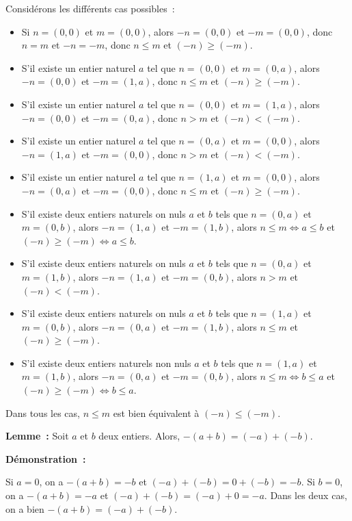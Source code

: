     Considérons les différents cas possibles : 
    \begin{itemize}[nosep]
        \item Si $n = (0,0)$ et $m = (0,0)$, alors $-n = (0,0)$ et $-m = (0,0)$, donc $n=m$ et $-n = -m$, donc $n \leq m$ et $(-n) \geq (-m)$.
        \item S'il existe un entier naturel $a$ tel que $n = (0,0)$ et $m = (0,a)$, alors $-n = (0,0)$ et $-m = (1,a)$, donc $n \leq m$ et $(-n) \geq (-m)$.
        \item S'il existe un entier naturel $a$ tel que $n = (0,0)$ et $m = (1,a)$, alors $-n = (0,0)$ et $-m = (0,a)$, donc $n > m$ et $(-n) < (-m)$.
        \item S'il existe un entier naturel $a$ tel que $n = (0,a)$ et $m = (0,0)$, alors $-n = (1,a)$ et $-m = (0,0)$, donc $n > m$ et $(-n) < (-m)$.
        \item S'il existe un entier naturel $a$ tel que $n = (1,a)$ et $m = (0,0)$, alors $-n = (0,a)$ et $-m = (0,0)$, donc $n \leq m$ et $(-n) \geq (-m)$.
        \item S'il existe deux entiers naturels on nuls $a$ et $b$ tels que $n = (0,a)$ et $m = (0,b)$, alors $-n = (1,a)$ et $-m = (1,b)$, alors $n \leq m \Leftrightarrow a \leq b$ et $(-n) \geq (-m) \Leftrightarrow a \leq b$.
        \item S'il existe deux entiers naturels on nuls $a$ et $b$ tels que $n = (0,a)$ et $m = (1,b)$, alors $-n = (1,a)$ et $-m = (0,b)$, alors $n > m$ et $(-n) < (-m)$.
        \item S'il existe deux entiers naturels on nuls $a$ et $b$ tels que $n = (1,a)$ et $m = (0,b)$, alors $-n = (0,a)$ et $-m = (1,b)$, alors $n \leq m$ et $(-n) \geq (-m)$.
        \item S'il existe deux entiers naturels non nuls $a$ et $b$ tels que $n = (1,a)$ et $m = (1,b)$, alors $-n = (0,a)$ et $-m = (0,b)$, alors $n \leq m \Leftrightarrow b \leq a$ et $(-n) \geq (-m) \Leftrightarrow b \leq a$.
    \end{itemize}
    Dans tous les cas, $n \leq m$ est bien équivalent à $(-n) \leq (-m)$.

    \done

\medskip

\noindent\textbf{Lemme :} Soit $a$ et $b$ deux entiers. 
    Alors, $-(a+b) = (-a) + (-b)$. 

\medskip

\noindent\textbf{Démonstration :} 

Si $a = 0$, on a $-(a+b) = -b$ et $(-a) + (-b) = 0 + (-b) = -b$. 
Si $b = 0$, on a $-(a+b) = -a$ et $(-a) + (-b) = (-a) + 0 = -a$. 
Dans les deux cas, on a bien $-(a+b) = (-a) + (-b)$.

